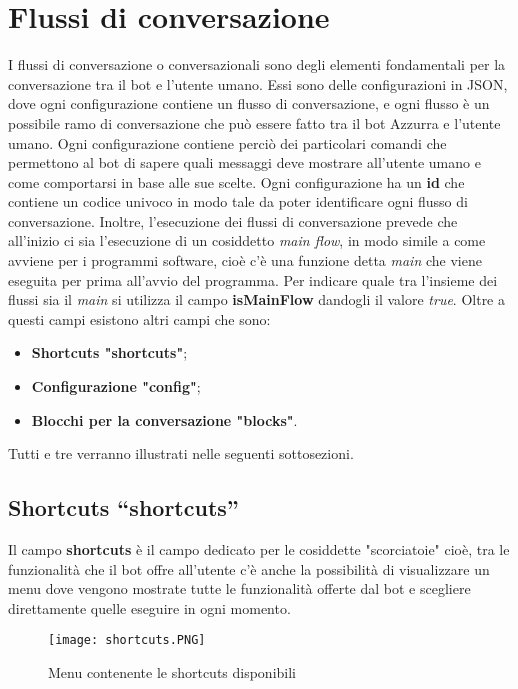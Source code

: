 \section{Flussi di conversazione}
I flussi di conversazione o conversazionali sono degli elementi fondamentali per la conversazione tra il bot e l'utente umano. Essi sono delle configurazioni in JSON, dove ogni configurazione contiene un flusso di conversazione, e ogni flusso è un possibile ramo di conversazione che può essere fatto tra il bot Azzurra e l'utente umano. Ogni configurazione contiene perciò dei particolari comandi che permettono al bot di sapere quali messaggi deve mostrare all'utente umano e come comportarsi in base alle sue scelte. Ogni configurazione ha un \textbf{id} che contiene un codice univoco in modo tale da poter identificare ogni flusso di conversazione. Inoltre, l'esecuzione dei flussi di conversazione prevede che all'inizio ci sia l'esecuzione di un cosiddetto \emph{main flow}, in modo simile a come avviene per i programmi software, cioè c'è una funzione detta \emph{main} che viene eseguita per prima all'avvio del programma. Per indicare quale tra l'insieme dei flussi sia il \emph{main} si utilizza il campo \textbf{isMainFlow} dandogli il valore \emph{true}.
Oltre a questi campi esistono altri campi che sono:
\begin{itemize}
	\item \textbf{Shortcuts "shortcuts"};
	\item \textbf{Configurazione "config"};
	\item \textbf{Blocchi per la conversazione "blocks"}.
\end{itemize}
Tutti e tre verranno illustrati nelle seguenti sottosezioni.
\subsection{Shortcuts “shortcuts”}
Il campo \textbf{shortcuts} è il campo dedicato per le cosiddette "scorciatoie" cioè, tra le funzionalità che il bot offre all'utente c'è anche la possibilità di visualizzare un menu dove vengono mostrate tutte le funzionalità offerte dal bot e scegliere direttamente quelle eseguire in ogni momento.

\begin{figure}[htbp]
	\centering
	\texttt{[image: shortcuts.PNG]}
	\caption{Menu contenente le shortcuts disponibili}
\end{figure}

